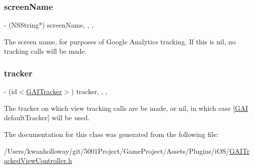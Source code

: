 \subsubsection{\texorpdfstring{screen\+Name}{screenName}}
{\footnotesize\ttfamily -\/ (N\+S\+String$\ast$) screen\+Name\hspace{0.3cm}{\ttfamily [read]}, {\ttfamily [write]}, {\ttfamily [nonatomic]}, {\ttfamily [copy]}}

The screen name, for purposes of Google Analytics tracking. If this is {\ttfamily nil}, no tracking calls will be made. \mbox{\label{interface_g_a_i_tracked_view_controller_aada15f00d99216066e81fb4328496179}} 
\subsubsection{\texorpdfstring{tracker}{tracker}}
{\footnotesize\ttfamily -\/ (id$<$\hyperlink{protocol_g_a_i_tracker-p}{G\+A\+I\+Tracker}$>$) tracker\hspace{0.3cm}{\ttfamily [read]}, {\ttfamily [write]}, {\ttfamily [nonatomic]}, {\ttfamily [assign]}}

The tracker on which view tracking calls are be made, or {\ttfamily nil}, in which case \mbox{[}\hyperlink{interface_g_a_i}{G\+AI} default\+Tracker\mbox{]} will be used. 

The documentation for this class was generated from the following file\+:\begin{DoxyCompactItemize}
\item 
/\+Users/kwanholloway/git/5001\+Project/\+Game\+Project/\+Assets/\+Plugins/i\+O\+S/\hyperlink{_g_a_i_tracked_view_controller_8h}{G\+A\+I\+Tracked\+View\+Controller.\+h}\end{DoxyCompactItemize}
